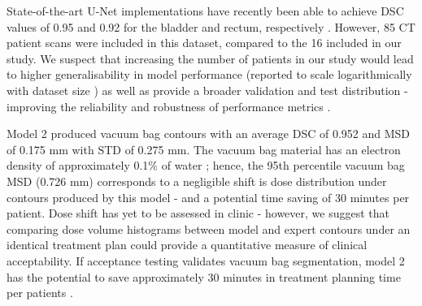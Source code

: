 State-of-the-art U-Net implementations have recently been able to achieve DSC values of 0.95 and 0.92 for the bladder and rectum, respectively \cite{Kazemifar_2018}. However, 85 CT patient scans were included in this dataset, compared to the 16 included in our study. We suspect that increasing the number of patients in our study would lead to higher generalisability in model performance (reported to scale logarithmically with dataset size \cite{Nemoto_2020}) as well as provide a broader validation and test distribution - improving the reliability and robustness of performance metrics \cite{Ronneberger_2015}. 

Model 2 produced vacuum bag contours with an average DSC of 0.952 and MSD of 0.175 mm with STD of 0.275 mm. The vacuum bag material has an electron density of approximately 0.1\% of water \cite{CITATION}; hence, the 95th percentile vacuum bag MSD (0.726 mm) corresponds to a negligible shift is
dose distribution under contours produced by this model - and a potential time saving of 30 minutes per patient. Dose shift has yet to be assessed  in clinic - however, we suggest that comparing dose volume histograms between model and expert contours under an identical treatment plan could provide a quantitative measure of clinical acceptability.
If acceptance testing validates vacuum bag segmentation, model 2 has the potential to save approximately 30 minutes in treatment planning time per patients \cite{CITATION}.

\newpage






